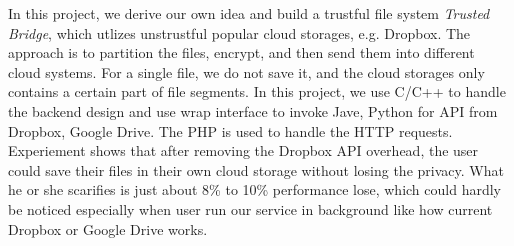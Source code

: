 In this project, we derive our own idea and build a trustful file system
\emph{Trusted Bridge}, which utlizes unstrustful popular cloud storages, e.g. Dropbox.%
The approach is to partition the files, encrypt, and then send them into different cloud systems. 
For a single file, we do not save it, and the cloud storages only contains a certain part of file 
segments. 
In this project, we use C/C++ to handle the backend design and use wrap interface to invoke Jave, Python
for API from Dropbox, Google Drive. The PHP is used to handle the HTTP requests. 
Experiement shows that after removing the Dropbox API overhead, the user could save their files in their own cloud storage without losing the privacy. What he or she scarifies is just about 8\% to 10\% performance lose, which could hardly be noticed especially when user run our service in background like how current Dropbox or Google Drive works.


